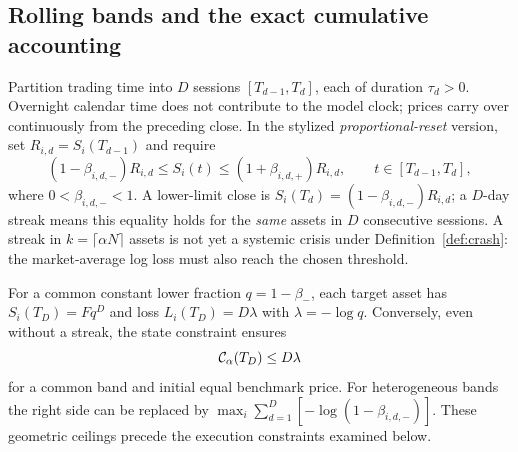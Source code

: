 \documentclass[review,hidelinks,onefignum,onetabnum]{siamonline250211}
\begin{document}
\subsection{Rolling bands and the exact cumulative accounting}\label{subsec:multiday-protocol}
Partition trading time into $D$ sessions $[T_{d-1},T_d]$, each of duration $\tau_d>0$. Overnight calendar time does not contribute to the model clock; prices carry over continuously from the preceding close. In the stylized \emph{proportional-reset} version, set $R_{i,d}=S_i(T_{d-1})$ and require
\begin{equation}\label{eq:rolling-band}
 (1-\beta_{i,d,-})R_{i,d}\le S_i(t)\le(1+\beta_{i,d,+})R_{i,d},
 \qquad t\in[T_{d-1},T_d],
\end{equation}
where $0<\beta_{i,d,-}<1$. A lower-limit close is
$S_i(T_d)=(1-\beta_{i,d,-})R_{i,d}$; a $D$-day streak means this equality holds for the \emph{same} assets in $D$ consecutive sessions. A streak in $k=\lceil\alpha N\rceil$ assets is not yet a systemic crisis under Definition~\ref{def:crash}: the market-average log loss must also reach the chosen threshold.

For a common constant lower fraction $q=1-\beta_-$, each target asset has
$S_i(T_D)=Fq^D$ and loss $L_i(T_D)=D\lambda$ with $\lambda=-\log q$. Conversely, even without a streak, the state constraint ensures
\begin{equation}\label{eq:rolling-cumulative-upper}
  \mathcal{C}_\alpha(T_D)\le D\lambda
\end{equation}
for a common band and initial equal benchmark price. For heterogeneous bands the right side can be replaced by
$\max_i\sum_{d=1}^D[-\log(1-\beta_{i,d,-})]$. These geometric ceilings precede the execution constraints examined below.
\end{document}
